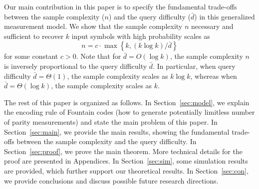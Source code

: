 \documentclass[11pt,onecolumn]{IEEEtran}
\newcommand{\beq}{\begin{equation}}
\newcommand{\eeq}{\end{equation}}
\newcommand{\bard}{\bar{d}}
\begin{document}
Our main contribution in this paper is to specify the fundamental trade-offs between the sample complexity ($n$) and the query difficulty ($\bard$) in this generalized measurement model. 
We show that the sample complexity $n$ necessary and sufficient to recover $k$ input symbols with high probability scales as
\beq\label{eqn:mainres}
n=c\cdot \max\left\{k,(k\log k)/{\bar{d}}\right\}
\eeq
for some constant $c>0$. 
Note that for $\bar{d}= O(\log k)$, the sample complexity $n$ is inversely proportional to the query difficulty $\bar{d}$. In particular, when query difficulty $\bar{d}=\Theta(1)$, the sample complexity scales as $k\log k$, whereas when $\bar{d}=\Theta(\log k)$, the sample complexity scales as $k$.

The rest of this paper is organized as follows. In Section~\ref{sec:model}, we explain the encoding rule of Fountain codes (how to generate potentially limitless number of parity measurements) and state the main problem of this paper. In Section~\ref{sec:main}, we provide the main results, showing the fundamental trade-offs between the sample complexity and the query difficulty. %
In Section~\ref{sec:proof}, we prove the main theorem. More technical details for the proof are presented in Appendices. In Section~\ref{sec:sim}, some simulation results are provided, which further support our theoretical results.
In Section~\ref{sec:con}, we provide conclusions and discuss possible future research directions. 
\end{document}
